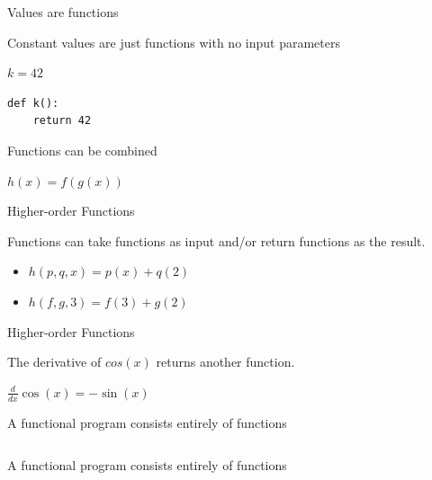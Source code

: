 \documentclass{beamer}
\begin{document}
\begin{frame}[fragile]{Values are functions}

  {\large Constant values are just functions with no input parameters}

  \vskip5mm

  {\Huge $k = 42$}

  \begin{verbatim}
def k():
    return 42
  \end{verbatim}

\end{frame}

\begin{frame}{Functions can be combined}

  {\Huge $h(x) = f(g(x))$}

\end{frame}

\begin{frame}{Higher-order Functions}

  {\Large Functions can take functions as input and/or return
    functions as the result.}

  \vskip5mm

  \begin{itemize}[<+->]
  \item {\Huge $h(p, q, x) = p(x) + q(2)$}
  \item {\Huge $h(f, g, 3) = f(3) + g(2)$}
  \end{itemize}

\end{frame}

\begin{frame}{Higher-order Functions}

  {\Large The derivative of $cos(x)$ returns another function.}

  \vskip5mm

  {\Huge $\frac{d}{dx}\cos(x) = -\sin(x)$}

\end{frame}

\begin{frame}{A functional program consists entirely of functions}

  \inputminted[firstline=5,lastline=10]{python}{code/justfunctions.py}

\end{frame}

\begin{frame}{A functional program consists entirely of functions}

  \inputminted[firstline=4]{haskell}{code/justfunctions.hs}

\end{frame}
\end{document}
